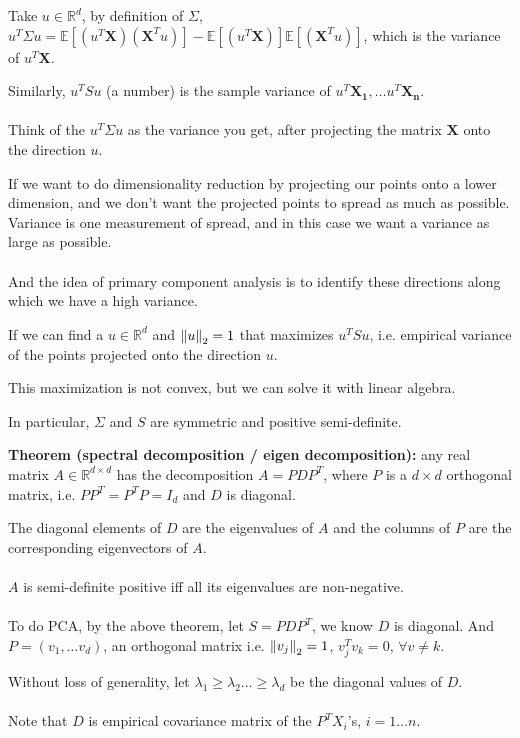 \documentclass{article}
\begin{document}
Take $u \in \mathbb{R}^d$, by definition of $\Sigma$,
$u^T \Sigma u = \mathbb{E}[(u^T \mathbf{X}) (\mathbf{X}^T u)] - \mathbb{E}[(u^T \mathbf{X})] \mathbb{E}[(\mathbf{X}^T u)]$,
which is the variance of $u^T \mathbf{X}$.

Similarly, $u^T S u$ (a number) is the sample variance of $u^T \mathbf{X_1}, \dots u^T \mathbf{X_n}$.
\\
\\
Think of the $u^T \Sigma u$ as the variance you get, after projecting the matrix $\mathbf{X}$ onto the direction $u$.

If we want to do dimensionality reduction by projecting our points onto a lower dimension,
and we don't want the projected points to spread as much as possible.
Variance is one measurement of spread, and in this case we want a variance as large as possible.
\\
\\
And the idea of primary component analysis is to identify these directions along which we have a high variance.

If we can find a $u \in \mathbb{R}^d$ and $\norm{u}_2 = 1$ that maximizes $u^T S u$,
i.e. empirical variance of the points projected onto the direction $u$.

This maximization is not convex, but we can solve it with linear algebra.

In particular, $\Sigma$ and $S$ are symmetric and positive semi-definite.

\textbf{Theorem (spectral decomposition / eigen decomposition):}
any real matrix $A \in \mathbb{R}^{d \times d}$ has the decomposition $A = P D P^T$,
where $P$ is a $d \times d$ orthogonal matrix, i.e. $P P^T = P^T P = \mathit{I}_d$ and
$D$ is diagonal.

The diagonal elements of $D$ are the eigenvalues of $A$ and the columns of $P$ are the corresponding eigenvectors of $A$.
\\
\\
$A$ is semi-definite positive iff all its eigenvalues are non-negative.
\\
\\

To do PCA, by the above theorem, let $S = P D P^T$, we know $D$ is diagonal.
And $P = (v_1, \dots v_d)$, an orthogonal matrix i.e. $\norm{v_j}_2 = 1$, $v_j^T v_k = 0$, $\forall v \neq k$.

Without loss of generality, let $\lambda_1 \geq \lambda_2 \dots \geq \lambda_d$ be the diagonal values of $D$.
\\
\\
Note that $D$ is empirical covariance matrix of the $P^T X_i$'s, $i = 1 \dots n$.
\end{document}
